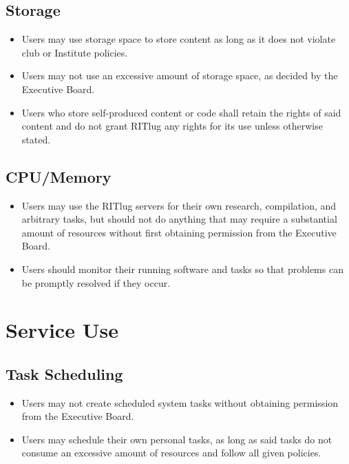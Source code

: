 \subsection{Storage}
\begin{itemize}
\item Users may use storage space to store content as long as it does not violate club or Institute policies.
\item Users may not use an excessive amount of storage space, as decided by the Executive Board.
\item Users who store self-produced content or code shall retain the rights of said content and do not grant RITlug any rights for its use unless otherwise stated.
\end{itemize}

\subsection{CPU/Memory}
\begin{itemize}
\item Users may use the RITlug servers for their own research, compilation, and arbitrary tasks, but should not do anything that may require a substantial amount of resources without first obtaining permission from the Executive Board.
\item Users should monitor their running software and tasks so that problems can be promptly resolved if they occur.
\end{itemize}

\section{Service Use}

\subsection{Task Scheduling}
\begin{itemize}
\item Users may not create scheduled system tasks without obtaining permission from the Executive Board.
\item Users may schedule their own personal tasks, as long as said tasks do not consume an excessive amount of resources and follow all given policies.
\end{itemize}

